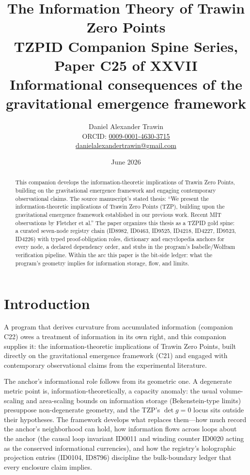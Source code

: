 \documentclass[11pt]{article}
\title{The Information Theory of Trawin Zero Points\\[0.6em]
\large TZPID Companion Spine Series, Paper C25 of XXVII\\
\normalsize Informational consequences of the gravitational emergence framework}
\author{Daniel Alexander Trawin\\
\small ORCID: \href{https://orcid.org/0009-0001-4630-3715}{0009-0001-4630-3715}\\
\small \href{mailto:danielalexandertrawin@gmail.com}{danielalexandertrawin@gmail.com}}
\date{June 2026}
\theoremstyle{remark}
\begin{document}
\maketitle

\begin{abstract}
This companion develops the information-theoretic implications of Trawin Zero Points, building on the gravitational emergence framework and engaging contemporary observational claims.
The source manuscript's stated thesis: ``We present the information-theoretic implications of Trawin Zero Points (TZP), building upon the gravitational emergence framework established in our previous work. Recent MIT observations by Fletcher et al.'' The paper organizes this thesis as a TZPID gold spine: a curated seven-node registry chain (ID8982, ID0463, ID9525, ID4218, ID4227, ID9523, ID4226) with typed proof-obligation roles, dictionary and encyclopedia anchors for every node, a declared dependency order, and stubs in the program's Isabelle/Wolfram verification pipeline. Within the arc this paper is the bit-side ledger: what the program's geometry implies for information storage, flow, and limits.
\end{abstract}

\section{Introduction}
\label{sec:intro}

A program that derives curvature from accumulated information (companion C22) owes a treatment of information in its own right, and this companion supplies it: the information-theoretic implications of Trawin Zero Points, built directly on the gravitational emergence framework (C21) and engaged with contemporary observational claims from the experimental literature.

The anchor's informational role follows from its geometric one. A degenerate metric point is, information-theoretically, a capacity anomaly: the usual volume-scaling and area-scaling bounds on information storage (Bekenstein-type limits) presuppose non-degenerate geometry, and the TZP's $\det g = 0$ locus sits outside their hypotheses. The framework develops what replaces them---how much record the anchor's neighborhood can hold, how information flows across loops about the anchor (the causal loop invariant ID0011 and winding counter ID0020 acting as the conserved informational currencies), and how the registry's holographic projection entries (ID0104, ID8796) discipline the bulk-boundary ledger that every enclosure claim implies.
\end{document}
